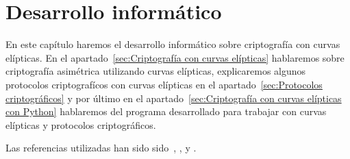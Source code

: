 \chapter{Desarrollo informático}
\label{ch:Desarrollo informático}

En este capítulo haremos el desarrollo informático sobre criptografía con curvas elípticas. En el apartado~\ref{sec:Criptografía con curvas elípticas} hablaremos sobre criptografía asimétrica utilizando curvas elípticas, explicaremos algunos protocolos criptografícos con curvas elípticas en el apartado~\ref{sec:Protocolos criptográficos} y por último en el apartado~\ref{sec:Criptografía con curvas elípticas con Python} hablaremos del programa desarrollado para trabajar con curvas elípticas y protocolos criptográficos.

Las referencias utilizadas han sido sido~\cite{Hankerson:2003}, \cite{Menezes:1996}, \cite{Washington:2008} y \cite{Silverman:2009}.




